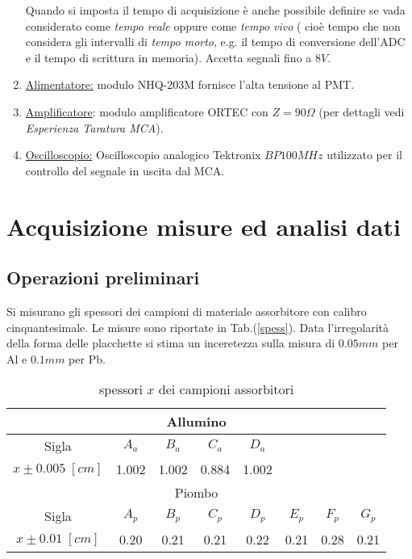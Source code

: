 \documentclass[12pt,a4paper,openright,twoside]{article}
\numberwithin{equation}{section} %
\begin{document}
\begin{enumerate}
Quando si imposta il tempo di acquisizione è anche possibile definire se vada considerato come \textit{tempo reale} oppure come \textit{tempo vivo} ( cioè tempo che non considera gli intervalli di \textit{tempo morto}, e.g. il tempo di conversione dell'ADC e il tempo di scrittura in memoria).
Accetta segnali fino a $8V$.

\item \underline{Alimentatore:} modulo NHQ-203M fornisce l'alta tensione al PMT.
\item \underline{Amplificatore}: modulo amplificatore ORTEC con $Z=90 \Omega $ (per dettagli vedi \textit{Esperienza Taratura MCA}).
\item \underline{Oscilloscopio:} Oscilloscopio analogico Tektronix $BP 100 MHz$ utilizzato per il controllo del segnale in uscita dal MCA.
\end{enumerate}

\section{Acquisizione misure ed analisi dati}
\subsection{Operazioni preliminari}
Si misurano gli spessori dei campioni di materiale assorbitore con calibro cinquantesimale. Le misure sono riportate in Tab.(\eqref{spess}). Data l'irregolarità della forma delle placchette si stima un inceretezza sulla misura di $0.05mm$ per Al e $0.1mm$ per Pb.

\begin{table}[]
\centering

\begin{tabular}{|c|c|c|c|c|c|c|c|}
\hline
\multicolumn{8}{|c|}{Allumino}                                         \\ \hline
Sigla             & $A_a$     &$ B_a$     & $C_a $    & $D_a$     &      &      &      \\ \hline
$x\pm 0.005 \;[cm]$ & 1.002 & 1.002 & 0.884 & 1.002 &      &      &      \\ \hline
\multicolumn{8}{|c|}{Piombo}                                           \\ \hline
Sigla             &$ A_p$     & $B_p $    & $C_p$     & $D_p $    & $E_p   $ & $F_p  $  & $G_p $   \\ \hline
$x\pm 0.01 \; [cm]$  & 0.20  & 0.21  & 0.21  & 0.22  & 0.21 & 0.28 & 0.21 \\ \hline

\end{tabular}
\caption{ spessori $x$ dei campioni assorbitori}
\label{spess}
\end{table}
\end{document}
